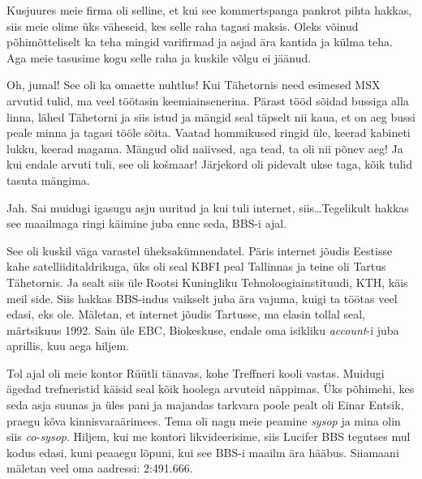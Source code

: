 Kusjuures meie firma oli selline, et kui see kommertspanga  pankrot pihta hakkas, siis meie olime üks väheseid, kes selle raha tagasi maksis. Oleks võinud põhimõtteliselt ka teha mingid varifirmad ja asjad ära kantida ja külma teha. Aga meie tasusime kogu selle raha ja kuskile võlgu ei jäänud.


Oh, jumal! See oli ka omaette nuhtlus! Kui Tähetornis need esimesed MSX arvutid tulid, ma veel töötasin keemiainsenerina. Pärast tööd sõidad bussiga alla linna, lähed Tähetorni ja siis istud ja mängid seal täpselt nii kaua, et on aeg bussi peale minna ja tagasi tööle sõita. Vaatad hommikused ringid üle, keerad kabineti lukku, keerad magama. Mängud olid naiivsed, aga tead, ta  oli nii põnev aeg! Ja kui endale arvuti tuli, see oli košmaar! Järjekord oli pidevalt ukse taga, kõik tulid tasuta mängima. 

Jah. Sai muidugi igasugu asju uuritud ja kui tuli internet, siis\ldots Tegelikult hakkas see maailmaga ringi käimine juba enne seda, BBS-i ajal.
                 

See oli kuskil väga varastel üheksakümnendatel. Päris internet jõudis Eestisse kahe satelliiditaldrikuga, üks oli seal KBFI peal Tallinnas ja teine oli Tartus Tähetornis. Ja sealt siis üle Rootsi Kuningliku Tehnoloogiainstituudi, KTH,  käis meil side. Siis hakkas BBS-indus vaikselt juba ära vajuma, kuigi ta  töötas veel edasi, eks ole. Mäletan, et internet jõudis Tartusse,  ma elasin tollal  seal, märtsikuus 1992. Sain üle  EBC, Biokeskuse, endale oma isikliku \emph{account}-i juba aprillis, kuu aega hiljem.
                 
Tol ajal oli meie kontor Rüütli tänavas, kohe Treffneri kooli vastas. Muidugi ägedad trefneristid  käisid seal kõik hoolega arvuteid näppimas. Üks põhimehi, kes seda asja suunas ja üles pani ja majandas tarkvara poole pealt oli Einar Entsik, praegu kõva kinnisvaraärimees. Tema oli nagu meie peamine \emph{sysop} ja mina olin siis \emph{co-sysop}. Hiljem, kui me kontori likvideerisime, siis Lucifer BBS tegutses mul kodus edasi, kuni peaaegu lõpuni, kui see BBS-i maailm ära hääbus. Siiamaani mäletan veel oma aadressi: 2:491.666.
           
